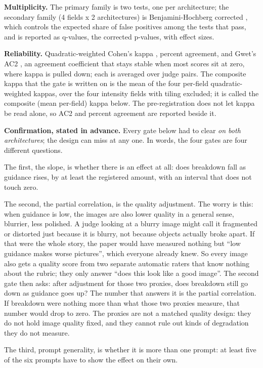 \documentclass[11pt]{article}
\begin{document}
\textbf{Multiplicity.} The primary family is two tests, one per architecture;
the secondary family (4 fields x 2 architectures) is Benjamini-Hochberg
corrected \citep{benjamini1995fdr}, which controls the expected share of false
positives among the tests that pass, and is reported as q-values, the corrected
p-values, with effect sizes.

\textbf{Reliability.} Quadratic-weighted Cohen's kappa \citep{cohen1968kappa},
percent agreement, and Gwet's AC2 \citep{gwet2008ac2}, an agreement coefficient
that stays stable when most scores sit at zero, where kappa is pulled down; each
is averaged over judge pairs. The composite kappa that the gate is written on is
the mean of the four per-field quadratic-weighted kappas, over the four
intensity fields with tiling excluded; it is called the composite (mean
per-field) kappa below. The pre-registration does not let kappa be read alone,
so AC2 and percent agreement are reported beside it.

\textbf{Confirmation, stated in advance.} Every gate below had to clear \emph{on
both architectures}; the design can miss at any one. In words, the four gates
are four different questions.

The first, the slope, is whether there is an effect at all: does breakdown fall
as guidance rises, by at least the registered amount, with an interval that does
not touch zero.

The second, the partial correlation, is the quality adjustment. The worry is
this: when guidance is low, the images are also lower quality in a general
sense, blurrier, less polished. A judge looking at a blurry image might call it
fragmented or distorted just because it is blurry, not because objects actually
broke apart. If that were the whole story, the paper would have measured nothing
but ``low guidance makes worse pictures'', which everyone already knew. So every
image also gets a quality score from two separate automatic raters that know
nothing about the rubric; they only answer ``does this look like a good image''.
The second gate then asks: after adjustment for those two proxies, does
breakdown still go down as guidance goes up? The number that answers it is the
partial correlation. If breakdown were nothing more than what those two proxies
measure, that number would drop to zero. The proxies are not a matched quality
design: they do not hold image quality fixed, and they cannot rule out kinds of
degradation they do not measure.

The third, prompt generality, is whether it is more than one prompt: at least
five of the six prompts have to show the effect on their own.
\end{document}
